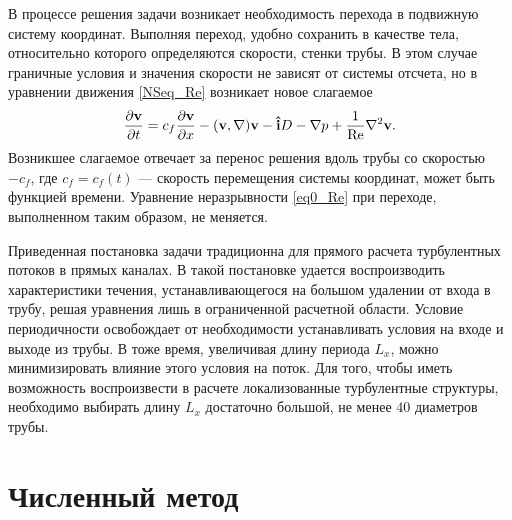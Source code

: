 В процессе решения задачи возникает необходимость перехода в подвижную систему координат. Выполняя переход, удобно сохранить в качестве тела, относительно которого определяются скорости, стенки трубы. В этом случае граничные условия и значения скорости не зависят от системы отсчета, но в уравнении движения \eqref{NSeq_Re} возникает новое слагаемое
\begin{equation}\label{NSeq_cf}
\frac{\partial \mathbf{v}}{\partial t} = c_f \frac{\partial \mathbf{v}}{\partial x} - (\mathbf{v}, \nabla) \mathbf{v} - \mathbf{\hat{i}} D - \nabla p + \frac{1}{\operatorname{Re}} \nabla^2 \mathbf{v}. 
\end{equation}
Возникшее слагаемое отвечает за перенос решения вдоль трубы со скоростью $-c_f$, где $c_f = c_f(t)$ --- скорость перемещения системы координат, может быть функцией времени. Уравнение неразрывности \eqref{eq0_Re} при переходе, выполненном таким образом, не меняется. 

Приведенная постановка задачи традиционна для прямого расчета турбулентных потоков в прямых каналах. В такой постановке удается воспроизводить характеристики течения, устанавливающегося на большом удалении от входа в трубу, решая уравнения лишь в ограниченной расчетной области. Условие периодичности освобождает от необходимости устанавливать условия на входе и выходе из трубы. В тоже время, увеличивая длину периода $L_x$, можно минимизировать влияние этого условия на поток. Для того, чтобы иметь возможность воспроизвести в расчете локализованные турбулентные структуры, необходимо выбирать длину $L_x$ достаточно большой, не менее $40$ диаметров трубы. 


\section{Численный метод} \label{num_method}

\begin{comment}
Поставленная задача решается численно конечно-разностным методом \cite{nikitin2006method}. Метод формулируется относительно уравнения движения \eqref{NSeq_Re}, преобразованного к виду 
\begin{equation}\label{NSeq_om}
\pd{\v}{t} = - \i D + \v \times \om - \nabla P - \frac{1}{\Re} \rot \om
\end{equation}
Здесь $\om = \rot \v$ --- вектор завихренности, посчитанный по полю скорости $\v$, $P = p + |\v|^2/2$ --- полное кинематическое давление. Эквивалентность уравнений \eqref{NSeq_Re} и \eqref{NSeq_om} следует из векторных тождеств
\begin{equation*}
-(\v, \nabla) \v = \v \times \rot \v - \nabla |\v|^2/2,
\end{equation*}
\begin{equation*}
\nabla^2 \v = \grad \div \v - \rot \rot \v.
\end{equation*}
\end{comment}

